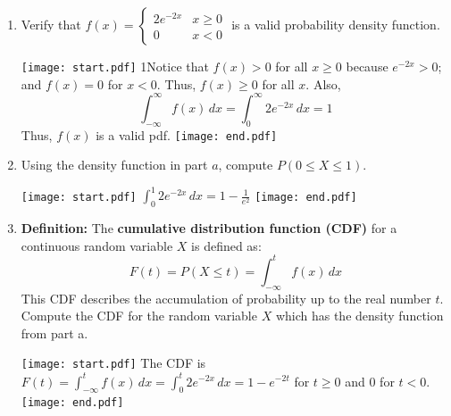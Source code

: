 \documentclass[12pt]{article}
\begin{document}
\begin{enumerate}
\begin{enumerate}

\item Verify that $f(x)=\left\{\begin{array}{ll}
2e^{-2x} & x \geq 0\\
0 & x <0
\end{array}\right.$ is a valid probability density function.

\texttt{[image: start.pdf]}
{{{1\linewidth}{Notice that $f(x) > 0$ for all $x\geq 0$ because $e^{-2x}>0$; and $f(x)=0$ for $x<0$.  Thus, $f(x) \geq 0$ for all $x$.  Also, $$\int_{-\infty}^{\infty}f(x) \,dx=\int_0^{\infty}2e^{-2x} \,dx =1$$  Thus, $f(x)$ is a valid pdf.}}}
\texttt{[image: end.pdf]}


\item Using the density function in part $a$, compute $P(0 \leq X \leq 1)$.

\texttt{[image: start.pdf]}
{{$\int_0^{1}2e^{-2x} \,dx=1-\frac{1}{e^2}$}}
\texttt{[image: end.pdf]}


\item {\bf Definition:} The {\bf cumulative distribution function (CDF)} for a continuous random variable $X$ is defined as: $$F(t)=P(X \leq t)=\int_{-\infty}^t f(x) \,dx$$  This CDF describes the accumulation of probability up to the real number $t$.  Compute the CDF for the random variable $X$ which has the density function from part a.

\texttt{[image: start.pdf]}
{{The CDF is $F(t)=\int_{-\infty}^{t}f(x) \,dx=\int_{0}^{t}2e^{-2x} \,dx=1-e^{-2t}$ for $t \geq 0$ and 0 for $t<0$.}}
\texttt{[image: end.pdf]}


\end{enumerate}

\end{enumerate}
\end{document}
